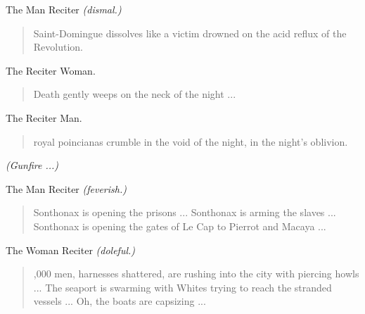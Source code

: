 \documentclass[letterpaper,article,12pt,oneside,notitlepage]{memoir}
\begin{document}
\begin{center}The Man Reciter \textit{(dismal.)}\end{center}

\begin{verse}
\indent Saint-Domingue dissolves like a victim drowned on the acid reflux of the Revolution. \\
\end{verse}

\begin{center}The Reciter Woman.\end{center}

\begin{verse}
\hspace{1cm} Death gently weeps on the neck of the night ... \\
\end{verse}

\clearpage

\begin{center}The Reciter Man.\end{center}

\begin{verse}
 royal poincianas crumble in the void of the night, in the night's oblivion.  \\
\end{verse}

\textit{(Gunfire ...)}


\begin{center}The Man Reciter \textit{(feverish.)}\end{center}

\begin{verse}
\hspace{1cm} Sonthonax is opening the prisons ... Sonthonax is arming the slaves ... \\
Sonthonax is opening the gates of Le Cap to Pierrot and Macaya ... \\
\end{verse}

\begin{center}The Woman Reciter \textit{(doleful.)}\end{center}

\begin{verse}
,000 men, harnesses shattered, are rushing into the city with piercing howls ... The seaport is swarming with Whites trying to reach the stranded vessels ... Oh, the boats are capsizing ...  \\
\end{verse}
\end{document}
